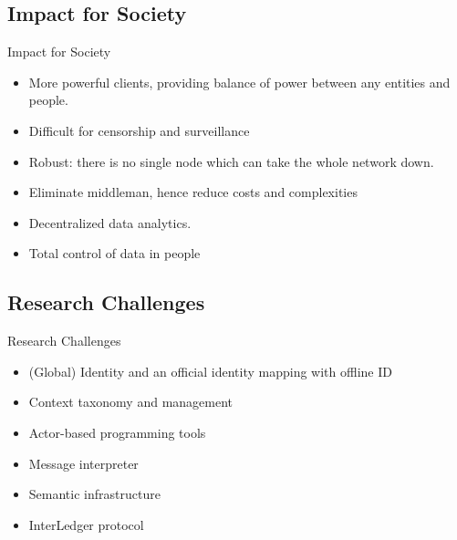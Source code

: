 \documentclass[10pt]{beamer}
\begin{document}
  \subsection{Impact for Society}

    \begin{frame}[fragile]{Impact for Society}
      \begin{itemize}
        \item More powerful clients, providing balance of power between any entities and people.
        \item Difficult for censorship and surveillance
        \item Robust: there is no single node which can take the whole network down.
        \item Eliminate middleman, hence reduce costs and complexities
        \item Decentralized data analytics.
        \item Total control of data in people
      \end{itemize}
    \end{frame}

  \subsection{Research Challenges}

    \begin{frame}[fragile]{Research Challenges}
      \begin{itemize}
        \item (Global) Identity and an official identity mapping with offline ID
        \item Context taxonomy and management
        \item Actor-based programming tools
        \item Message interpreter
        \item Semantic infrastructure
        \item InterLedger protocol
      \end{itemize}
    \end{frame}
\end{document}
